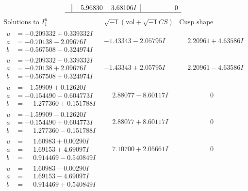 \documentclass[1p]{elsarticle_modified}
\theoremstyle{definition}
\newcommand{\I}{\sqrt{-1}}
\begin{document}
$$\begin{array}{c|c|c}
 & \phantom{-}5.96830 + 3.68106 I & \phantom{-0.000000 } 0\\
 \hline 
 \end{array}$$\newpage$$\begin{array}{c|c|c}  
\text{Solutions to }I^u_{1}& \I (\text{vol} + \sqrt{-1}CS) & \text{Cusp shape}\\
 \hline 
\begin{aligned}
u &= -0.209332 + 0.339332 I \\
a &= -0.70138 - 2.09676 I \\
b &= -0.567508 - 0.324974 I\end{aligned}
 & -1.43343 - 2.05795 I & \phantom{-}2.20961 + 4.63586 I \\ \hline\begin{aligned}
u &= -0.209332 - 0.339332 I \\
a &= -0.70138 + 2.09676 I \\
b &= -0.567508 + 0.324974 I\end{aligned}
 & -1.43343 + 2.05795 I & \phantom{-}2.20961 - 4.63586 I \\ \hline\begin{aligned}
u &= -1.59909 + 0.12620 I \\
a &= -0.154490 - 0.604773 I \\
b &= \phantom{-}1.277360 + 0.151788 I\end{aligned}
 & \phantom{-}2.88077 - 8.60117 I & \phantom{-0.000000 } 0 \\ \hline\begin{aligned}
u &= -1.59909 - 0.12620 I \\
a &= -0.154490 + 0.604773 I \\
b &= \phantom{-}1.277360 - 0.151788 I\end{aligned}
 & \phantom{-}2.88077 + 8.60117 I & \phantom{-0.000000 } 0 \\ \hline\begin{aligned}
u &= \phantom{-}1.60983 + 0.00290 I \\
a &= \phantom{-}1.69153 + 4.69097 I \\
b &= \phantom{-}0.914469 - 0.540849 I\end{aligned}
 & \phantom{-}7.10700 + 2.05661 I & \phantom{-0.000000 } 0 \\ \hline\begin{aligned}
u &= \phantom{-}1.60983 - 0.00290 I \\
a &= \phantom{-}1.69153 - 4.69097 I \\
b &= \phantom{-}0.914469 + 0.540849 I\end{aligned}

\end{array}$$
\end{document}
